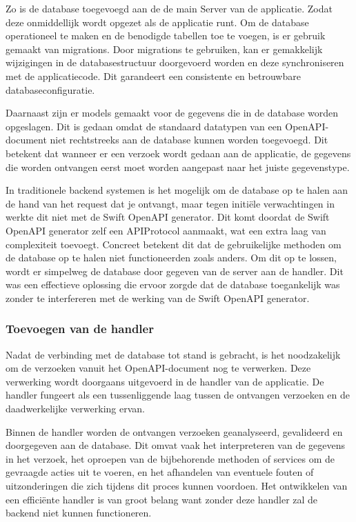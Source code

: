 Zo is de database toegevoegd aan de de main Server van de applicatie. Zodat deze onmiddellijk wordt opgezet als de applicatie runt. Om de database operationeel te maken en de benodigde tabellen toe te voegen, is er gebruik gemaakt van migrations. Door migrations te gebruiken, kan er gemakkelijk wijzigingen in de databasestructuur doorgevoerd worden en deze synchroniseren met de applicatiecode. Dit garandeert een consistente en betrouwbare databaseconfiguratie.

Daarnaast zijn er  models gemaakt voor de gegevens die in de database worden opgeslagen. Dit is gedaan omdat de standaard datatypen van een OpenAPI-document niet rechtstreeks aan de database kunnen worden toegevoegd. Dit betekent dat wanneer er een verzoek wordt gedaan aan de applicatie, de gegevens die worden ontvangen eerst moet worden aangepast naar het juiste gegevenstype.

In traditionele backend systemen is het mogelijk om de database op te halen aan de hand van het request dat je ontvangt, maar tegen initiële verwachtingen in werkte dit niet met de Swift OpenAPI generator. Dit komt doordat de Swift OpenAPI generator zelf een APIProtocol aanmaakt, wat een extra laag van complexiteit toevoegt. Concreet betekent dit dat de gebruikelijke methoden om de database op te halen niet functioneerden zoals anders. Om dit op te lossen, wordt er simpelweg de database door gegeven van de server aan de handler. Dit was een effectieve oplossing die ervoor zorgde dat de database toegankelijk was zonder te interfereren met de werking van de Swift OpenAPI generator.

\subsubsection{Toevoegen van de handler}
Nadat de verbinding met de database tot stand is gebracht, is het noodzakelijk om de verzoeken vanuit het OpenAPI-document nog te verwerken. Deze verwerking wordt doorgaans uitgevoerd in de handler van de applicatie. De handler fungeert als een tussenliggende laag tussen de ontvangen verzoeken en de daadwerkelijke verwerking ervan.

Binnen de handler worden de ontvangen verzoeken geanalyseerd, gevalideerd en doorgegeven aan de database. Dit omvat vaak het interpreteren van de gegevens in het verzoek, het oproepen van de bijbehorende methoden of services om de gevraagde acties uit te voeren, en het afhandelen van eventuele fouten of uitzonderingen die zich tijdens dit proces kunnen voordoen. Het ontwikkelen van een efficiënte handler is van groot belang want zonder deze handler zal de backend niet kunnen functioneren.


